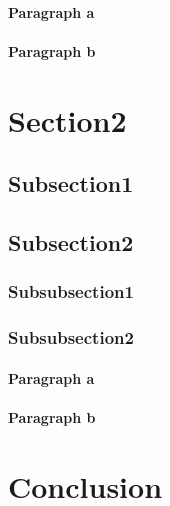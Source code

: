 \paragraph{Paragraph a}

\paragraph{Paragraph b}

\section{Section2}

\subsection{Subsection1}

\subsection{Subsection2}

\subsubsection{Subsubsection1}

\subsubsection{Subsubsection2}

\paragraph{Paragraph a}

\paragraph{Paragraph b}


\newpage

\section*{Conclusion}



